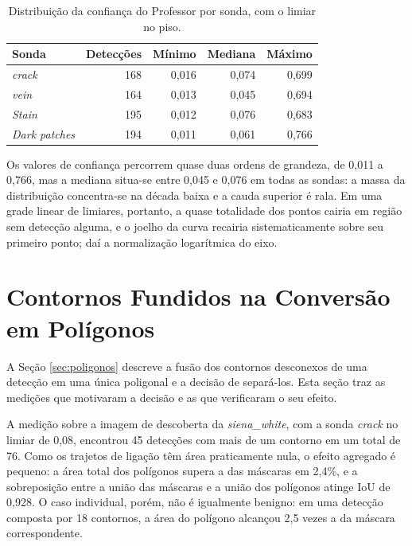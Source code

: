 \begin{table}[ht]
  \caption{Distribuição da confiança do Professor por sonda, com o limiar no piso.}
  \label{tab:escores}
  \centering
  \begin{tabular}{lrrrr}
    \hline
    \bfseries Sonda & \bfseries Detecções & \bfseries Mínimo & \bfseries Mediana & \bfseries Máximo \\
    \hline
    \textit{crack}        & 168 & 0,016 & 0,074 & 0,699 \\
    \textit{vein}         & 164 & 0,013 & 0,045 & 0,694 \\
    \textit{Stain}        & 195 & 0,012 & 0,076 & 0,683 \\
    \textit{Dark patches} & 194 & 0,011 & 0,061 & 0,766 \\
    \hline
  \end{tabular}
\end{table}

Os valores de confiança percorrem quase duas ordens de grandeza, de 0,011 a 0,766, mas a mediana situa-se entre 0,045 e 0,076 em todas as sondas: a massa da distribuição concentra-se na década baixa e a cauda superior é rala. Em uma grade linear de limiares, portanto, a quase totalidade dos pontos cairia em região sem detecção alguma, e o joelho da curva recairia sistematicamente sobre seu primeiro ponto; daí a normalização logarítmica do eixo.

\section{Contornos Fundidos na Conversão em Polígonos}
\label{sec:res_contornos}

A Seção \ref{sec:poligonos} descreve a fusão dos contornos desconexos de uma detecção em uma única poligonal e a decisão de separá-los. Esta seção traz as medições que motivaram a decisão e as que verificaram o seu efeito.

A medição sobre a imagem de descoberta da \textit{siena\_white}, com a sonda \textit{crack} no limiar de 0,08, encontrou 45 detecções com mais de um contorno em um total de 76. Como os trajetos de ligação têm área praticamente nula, o efeito agregado é pequeno: a área total dos polígonos supera a das máscaras em 2,4\%, e a sobreposição entre a união das máscaras e a união dos polígonos atinge IoU de 0,928. O caso individual, porém, não é igualmente benigno: em uma detecção composta por 18 contornos, a área do polígono alcançou 2,5 vezes a da máscara correspondente.

